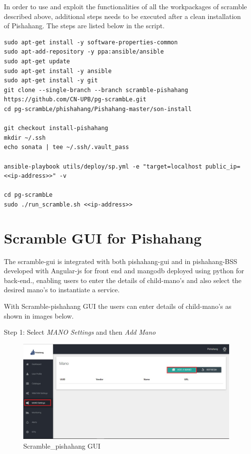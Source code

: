 In order to use and exploit the functionalities of all the workpackages of scramble described above, additional steps needs to be executed after a clean installation of Pishahang. The steps are listed below in the script.
\begin{lstlisting}[caption= install Pishahang with scramble, label=lis:Pishahang_scramble]
sudo apt-get install -y software-properties-common
sudo apt-add-repository -y ppa:ansible/ansible
sudo apt-get update
sudo apt-get install -y ansible
sudo apt-get install -y git
git clone --single-branch --branch scramble-pishahang https://github.com/CN-UPB/pg-scrambLe.git
cd pg-scrambLe/phishahang/Pishahang-master/son-install

git checkout install-pishahang
mkdir ~/.ssh
echo sonata | tee ~/.ssh/.vault_pass

ansible-playbook utils/deploy/sp.yml -e "target=localhost public_ip=<<ip-address>>" -v

cd pg-scrambLe
sudo ./run_scramble.sh <<ip-address>>

\end{lstlisting}

\section{Scramble GUI for Pishahang}
The scramble-gui is integrated with both pishahang-gui and in pishahang-BSS developed with Angular-js for front end and mangodb deployed using python for back-end., enabling users to enter the details of child-mano's and also select the desired mano's to instantiate a service.

With Scramble-pishahang GUI the users can enter details of child-mano's as shown in images below.

Step 1: Select \textit{MANO Settings} and then \textit{Add Mano}
\begin{figure}[H]
	\centering
	\includegraphics[width=1\linewidth]{"figures/son-gui-step-1"}
	\caption{Scramble_pishahang GUI}
	\label{fig:sequence-diagram-scramble}
\end{figure}

